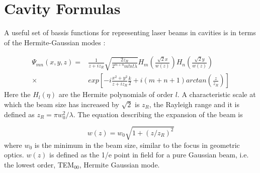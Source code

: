 %
\chapter{Cavity Formulas}
\label{app:modes}

A useful set of bassis functions for representing laser beams in cavities is in
terms of the Hermite-Gaussian modes \cite{Mizuno:Thesis}:

\begin{equation}
\begin{split}
\Psi_{mn}(x,y,z) =
                &\frac{1}{z+i z_{R}} \sqrt{\frac{2 z_{R}}{2^{m+n}m!n!\lambda}}
                H_{m}(\frac{\sqrt{2} x}{w(z)})H_{n}(\frac{\sqrt{2} y}{w(z)}) \\
         \times &exp[-i\frac{x^2+y^2}{z+i z_{R}}\frac{k}{2}+
                      i(m+n+1)arctan(\frac{z}{z_{R}})]
\end{split}
\end{equation}
Here the $H_{l}(\eta)$ are the Hermite polynomials of order $l$. A
characteristic scale at which the beam size has increased by $\sqrt{2}$
is $z_{R}$, the Rayleigh range and it is defined as 
$z_{R}=\pi w_{0}^{2}/\lambda$. The equation describing the expansion of
the beam is

\begin{equation}
w(z) = w_{0} \sqrt{1 + (z/z_{R})^{2}}
\end{equation}
where $w_{0}$ is the minimum in the beam size, similar to the focus in
geometric optics. $w(z)$ is defined as the 1/e point in field for a pure
Gaussian beam, i.e. the lowest order, TEM$_{00}$, Hermite Gaussian mode.

